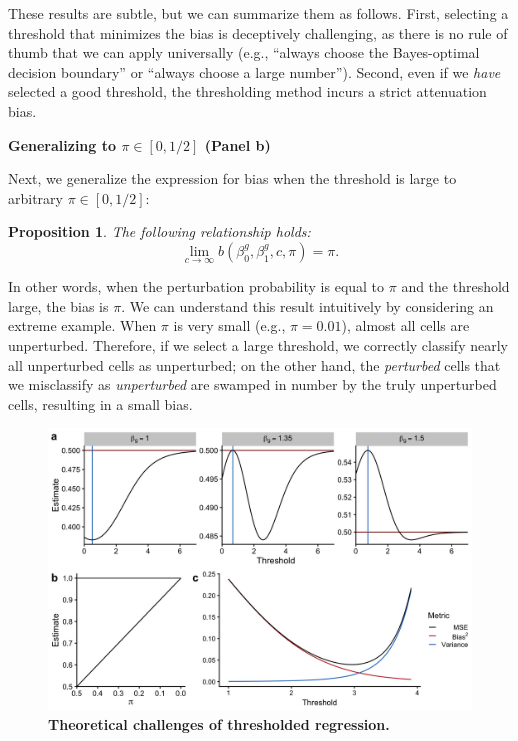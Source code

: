 \documentclass[12pt]{article}
\newtheorem{proposition}{Proposition}
\begin{document}
These results are subtle, but we can summarize them as follows. First, selecting a threshold that minimizes the bias is deceptively challenging, as there is no rule of thumb that we can apply universally (e.g., ``always choose the Bayes-optimal decision boundary'' or ``always choose a large number''). Second, even if we \textit{have} selected a good threshold, the thresholding method incurs a strict attenuation bias.

\begin{center}
\textbf{Generalizing to $\pi \in [0,1/2]$ (Panel b)}
\end{center}

Next, we generalize the expression for bias when the threshold is large to arbitrary $\pi \in [0,1/2]$:
\begin{proposition}
The following relationship holds:
$$ \lim_{ c \to \infty } b(\beta^g_0, \beta^g_1, c, \pi) = \pi.$$
\end{proposition}
In other words, when the perturbation probability is equal to $\pi$ and the threshold large, the bias is $\pi$. We can understand this result intuitively by considering an extreme example. When $\pi$ is very small (e.g., $\pi = 0.01$), almost all cells are unperturbed. Therefore, if we select a large threshold, we correctly classify nearly all unperturbed cells as unperturbed; on the other hand, the \textit{perturbed} cells that we misclassify as \textit{unperturbed} are swamped in number by the truly unperturbed cells, resulting in a small bias.

\begin{figure}[h!]
	\centering
	\includegraphics[width=1\linewidth]{../../figures/thresholding_theoretical/plot}
	\caption{\textbf{Theoretical challenges of thresholded regression.}}
	\label{thresholding_theoretical}
\end{figure}
\end{document}
